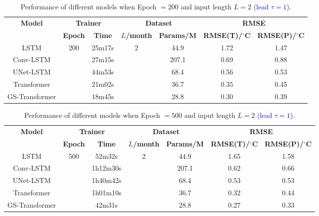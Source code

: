 \documentclass[published]{agujournal2025}
\newcommand{\rev}[1]{\textcolor{blue}{#1}}
\begin{document}
\begin{table}[h]
\caption{Performance of different models when Epoch $=200$ and input length $L=2$ \rev{(lead $\tau=1$)}.}
\label{tab:horizon_skill_200_t2}
\centering
\scriptsize
\renewcommand{\arraystretch}{1.8}
\begin{tabular}{ccccccc}
\hline
\multirow{2}{*}{\textbf{Model}} & \multicolumn{2}{c}{\textbf{Trainer}} & \multicolumn{2}{c}{\textbf{Dataset}} & \multicolumn{2}{c}{\textbf{RMSE}} \\ \cline{2-7}
 & \textbf{Epoch} & \textbf{Time} & \textbf{$L$/month} & \textbf{Params/M} & \textbf{RMSE(T)/$^\circ$C} & \textbf{RMSE(P)/$^\circ$C} \\ \hline
LSTM & \multirow{5}{*}{200} & 25m17s & \multirow{5}{*}{2} & 44.9 & 1.72 & 1.47 \\
Conv-LSTM & & 27m15s & & 207.1 & 0.69 & 0.88 \\
UNet-LSTM & & 44m53s & & 68.4 & 0.56 & 0.53 \\
Transformer & & 21m02s & & 36.7 & 0.35 & 0.45 \\
GS-Transformer & & 18m45s & & 28.8 & 0.30 & 0.39 \\ \hline
\end{tabular}
\end{table}

\begin{table}[h]
\caption{Performance of different models when Epoch $=500$ and input length $L=2$ \rev{(lead $\tau=1$)}.}
\label{tab:horizon_skill_500_t2}
\centering
\scriptsize
\renewcommand{\arraystretch}{1.8}
\begin{tabular}{ccccccc}
\hline
\multirow{2}{*}{\textbf{Model}} & \multicolumn{2}{c}{\textbf{Trainer}} & \multicolumn{2}{c}{\textbf{Dataset}} & \multicolumn{2}{c}{\textbf{RMSE}} \\ \cline{2-7}
 & \textbf{Epoch} & \textbf{Time} & \textbf{$L$/month} & \textbf{Params/M} & \textbf{RMSE(T)/$^\circ$C} & \textbf{RMSE(P)/$^\circ$C} \\ \hline
LSTM & \multirow{5}{*}{500} & 52m32s & \multirow{5}{*}{2} & 44.9 & 1.65 & 1.58 \\
Conv-LSTM & & 1h12m30s & & 207.1 & 0.62 & 0.66 \\
UNet-LSTM & & 1h40m42s & & 68.4 & 0.53 & 0.53 \\
Transformer & & 1h01m10s & & 36.7 & 0.32 & 0.44 \\
GS-Transformer & & 42m31s & & 28.8 & 0.27 & 0.33 \\ \hline
\end{tabular}
\end{table}
\end{document}

